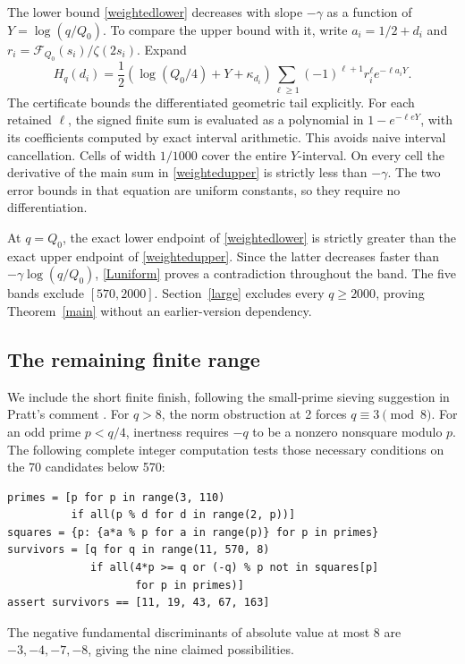 \documentclass[11pt]{article}
\begin{document}
The lower bound \eqref{weightedlower} decreases with slope
\(-\gamma\) as a function of \(Y=\log(q/Q_0)\). To compare the
upper bound with it, write
\(a_i=1/2+d_i\) and
\(r_i=\mathcal F_{Q_0}(s_i)/\zeta(2s_i)\). Expand
\[
 H_q(d_i)=\frac12(\log(Q_0/4)+Y+\kappa_{d_i})
       \sum_{\ell\ge1}(-1)^{\ell+1}r_i^\ell e^{-\ell a_iY}.
\]
The certificate bounds the differentiated geometric tail explicitly.
For each retained \(\ell\), the signed finite sum is evaluated as
a polynomial in \(1-e^{-\ell eY}\), with its coefficients computed
by exact interval arithmetic. This avoids naive interval cancellation.
Cells of width \(1/1000\) cover the entire \(Y\)-interval. On every
cell the derivative of the main sum in \eqref{weightedupper} is
strictly less than \(-\gamma\). The two error bounds in that equation
are uniform constants, so they require no differentiation.


At \(q=Q_0\), the exact lower endpoint of
\eqref{weightedlower} is strictly greater than the exact upper
endpoint of \eqref{weightedupper}. Since the latter decreases faster
than \(-\gamma\log(q/Q_0)\), \eqref{Luniform} proves a contradiction
throughout the band. The five bands exclude \([570,2000]\).
Section~\ref{large} excludes every \(q\ge2000\), proving
Theorem~\ref{main} without an earlier-version dependency.

\subsection{The remaining finite range}\label{finite}
We include the short finite finish, following the small-prime sieving
suggestion in Pratt's comment \cite{prattsieve}.
For \(q>8\), the norm obstruction at 2 forces \(q\equiv3\pmod8\).
For an odd prime \(p<q/4\), inertness requires \(-q\) to be a nonzero
nonsquare modulo \(p\). The following complete integer computation
tests those necessary conditions on the 70 candidates below 570:
\begin{verbatim}
primes = [p for p in range(3, 110)
          if all(p % d for d in range(2, p))]
squares = {p: {a*a % p for a in range(p)} for p in primes}
survivors = [q for q in range(11, 570, 8)
             if all(4*p >= q or (-q) % p not in squares[p]
                    for p in primes)]
assert survivors == [11, 19, 43, 67, 163]
\end{verbatim}
The negative fundamental discriminants of absolute value at most 8 are
\(-3,-4,-7,-8\), giving the nine claimed possibilities.
\end{document}
